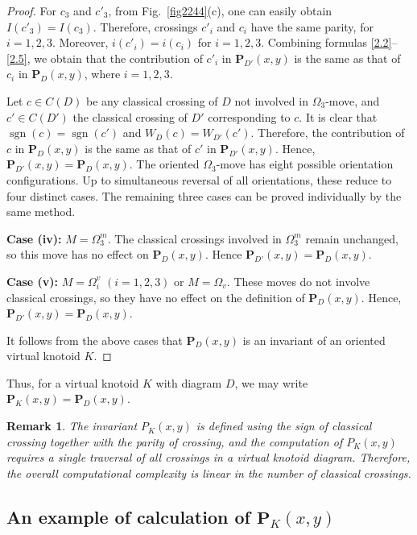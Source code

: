 \documentclass[12pt]{amsart}
\theoremstyle{noparens}
\newtheorem{remark}{Remark}[section]
\numberwithin{equation}{section}
\numberwithin{equation}{section}
\begin{document}
\begin{proof}
	For $c_3$ and $c'_3$, from Fig.~\ref{fig2244}(c), one can easily obtain $I(c'_3) = I(c_3)$. Therefore, crossings $c'_i$ and $c_i$ have the same parity, for $i=1, 2, 3$. Moreover, $i(c'_i) = i(c_i)$ for $i=1, 2, 3$. Combining formulas \eqref{2.2}--\eqref{2.5}, we obtain that the contribution of $c'_i$ in $\mathbf{P}_{D'}(x,y)$ is the same as that of $c_i$ in $\mathbf{P}_{D}(x,y)$, where $i=1, 2, 3$. 
	
	Let $c\in C(D)$ be any classical crossing of $D$ not involved in $\Omega_3$-move, and $c'\in C(D')$ the classical crossing of $D'$ corresponding to $c$. It is clear that $\operatorname{sgn}(c)=\operatorname{sgn}(c')$ and $W_D(c)=W_{D'}(c')$. Therefore, the contribution of $c$ in $\mathbf{P}_D(x,y)$ is the same as that of $c'$ in $\mathbf{P}_{D'}(x,y)$. Hence, $\mathbf{P}_{D'}(x,y)=\mathbf{P}_D(x,y).$ The oriented $\Omega_3$-move has eight possible orientation configurations. Up to simultaneous reversal of all orientations, these reduce to four distinct cases. The remaining three cases can be proved individually by the same method.
	
	\noindent
	\textbf{Case (iv):} $M = \Omega^{m}_3$. The classical crossings involved in $\Omega^{m}_3$ remain unchanged, so this move has no effect on $\mathbf{P}_D(x,y)$. Hence $\mathbf{P}_{D'}(x,y) = \mathbf{P}_D(x,y)$.
	
	\noindent
	\textbf{Case (v):} $M = \Omega^{v}_i$ $(i=1,2,3)$ or $M = \Omega_v$. These moves do not involve classical crossings, so they have no effect on the definition of $\mathbf{P}_D(x,y)$. Hence, $\mathbf{P}_{D'}(x,y)=\mathbf{P}_D(x,y)$.
	
	It follows from the above cases that $\mathbf{P}_D(x,y)$ is an invariant of an oriented virtual knotoid $K$.
\end{proof}
Thus, for a virtual knotoid $K$ with diagram $D$, we may write $\mathbf{P}_K(x,y)=\mathbf{P}_D(x,y)$. 

\begin{remark}
	{\rm
		The invariant $P_K(x,y)$ is defined using the sign of classical crossing together with the parity of crossing, and the computation of $P_K(x,y)$ requires a single traversal of all crossings in a virtual knotoid diagram. Therefore, the overall computational complexity is linear in the number of classical crossings.
	}	
\end{remark}

\subsection{An example of calculation of $\mathbf{P}_K(x,y)$}
\end{document}
